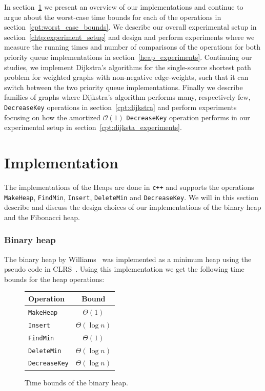 \documentclass[a4paper,oneside,article,11pt]{memoir}
\begin{document}
In section~\ref{cpt:implementation} we present an overview of our implementations and continue to argue about the worst-case time bounds for each of the operations in section~\ref{cpt:worst_case_bounds}. We describe our overall experimental setup in section~\ref{chtp:experiment_setup} and design and perform experiments where we measure the running times and number of comparisons of the operations for both priority queue implementations in section~\ref{heap_experiments}. Continuing our studies, we implement Dijkstra's algorithms for the single-source shortest path problem for weighted graphs with non-negative edge-weights, such that it can switch between the two priority queue implementations. Finally we describe families of graphs where Dijkstra's algorithm performs many, respectively few, \texttt{DecreaseKey} operations in section~\ref{cpt:dijkstra} and perform experiments focusing on how the amortized $\mathcal{O}(1)$ \texttt{DecreaseKey} operation performs in our experimental setup in section~\ref{cpt:dijksta_experiments}.

\chapter{Implementation}
\label{cpt:implementation}
The implementations of the Heaps are done in \texttt{c++} and supports the operations \texttt{MakeHeap}, \texttt{FindMin}, \texttt{Insert}, \texttt{DeleteMin} and \texttt{DecreaseKey}. We will in this section describe and discuss the design choices of our implementations of the binary heap and the Fibonacci heap.

\subsection{Binary heap}
The binary heap by Williams~\cite{williams} was implemented as a minimum heap using the pseudo code in CLRS~\cite[p.~151-170]{clrs}. Using this implementation we get the following time bounds for the heap operations:

\begin{figure}[H]
\centering
\begin{tabular}{l|c}
Operation & Bound \\\hline
\texttt{MakeHeap} & $\Theta(1)$ \\\hline
\texttt{Insert} & $\Theta(\log n)$ \\\hline
\texttt{FindMin} & $\Theta(1)$ \\\hline
\texttt{DeleteMin} & $\Theta(\log n)$ \\\hline
\texttt{DecreaseKey} & $\Theta(\log n)$
\end{tabular}
\caption{Time bounds of the binary heap.}
\end{figure}
\end{document}
